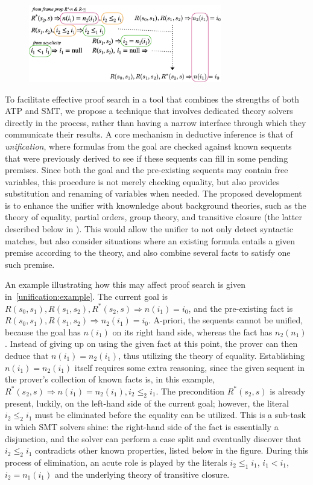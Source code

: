 \begin{figure}
\centering
\includegraphics[width=0.75\textwidth]{img/unification-modulo-theories.pdf}
\caption{}
\label{unification:example}
\end{figure}

To facilitate effective proof search in a tool that combines the strengths of both ATP and SMT,
we propose a technique that involves dedicated theory solvers directly in the process, rather than having a narrow interface through which they communicate their results.
A core mechanism in deductive inference is that of \emph{unification}, where formulas from the goal are checked against known sequents that were previously derived to see if these sequents can fill in some pending premises.
Since both the goal and the pre-existing sequents may contain free variables, this procedure is not merely checking equality, but also provides substitution and renaming of variables when needed.
The proposed development is to enhance the unifier with knownledge about background theories, such as the theory of equality, partial orders, group theory, and transitive closure (the latter described below in \todo{}).
This would allow the unifier to not only detect syntactic matches, but also consider situations where an existing formula entails a given premise according to the theory,
and also combine several facts to satisfy one such premise.

An example illustrating how this may affect proof search is given in~\autoref{unification:example}.
The current goal is
$R(s_0,s_1), R(s_1,s_2),R^*(s_2,s) \Rightarrow
n(i_1) = i_0$,
and the pre-existing fact is
$R(s_0,s_1), R(s_1,s_2) \Rightarrow n_2(i_1)=i_0$.
A-priori, the sequents cannot be unified, because the goal has $n(i_1)$ on its right hand side, whereas the fact has $n_2(n_1)$.
Instead of giving up on using the given fact at this point, the prover can then deduce that $n(i_1)=n_2(i_1)$, thus utilizing the theory of equality.
Establishing $n(i_1)=n_2(i_1)$ itself requires some extra reasoning, since the given sequent in the prover's collection of known facts is, in this example,
$R^*(s_2,s)\Rightarrow n(i_1)=n_2(i_1), i_2\leq_2 i_1$.
The precondition $R^*(s_2,s)$ is already present, luckily, on the left-hand side of the current goal;
however, the literal $i_2\leq_2 i_1$ must be eliminated before the equality can be utilized.
This is a sub-task in which SMT solvers shine:
the right-hand side of the fact is essentially a disjunction, and the solver can perform a case split and eventually discover that $i_2\leq_2 i_1$ contradicts other known properties, listed below in the figure.
During this process of elimination, an acute role is played by the literals $i_2\leq_1 i_1$, $i_1<i_1$, $i_2=n_1(i_1)$ and the underlying theory of transitive closure.

